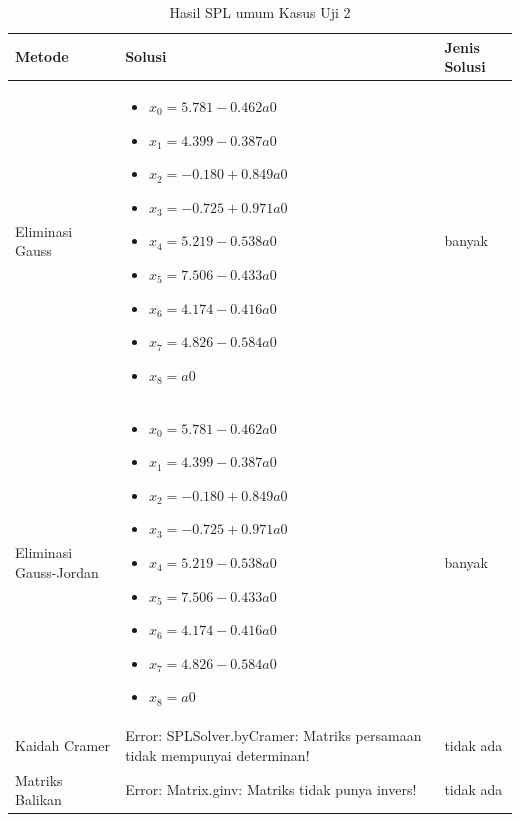 \documentclass[12pt,a4paper]{report}
\begin{document}
\begin{table}[H]
    \centering
    \caption{Hasil SPL umum Kasus Uji 2}
    \begin{tabular}{|l|p{5cm}|l|}
        \hline
        \textbf{Metode} & \textbf{Solusi} & \textbf{Jenis Solusi} \\
        \hline
        Eliminasi Gauss & 
        \begin{itemize}
            \item $x_0 = 5.781 - 0.462a0$
            \item $x_1 = 4.399 - 0.387a0$
            \item $x_2 = -0.180 + 0.849a0$
            \item $x_3 = -0.725 + 0.971a0$
            \item $x_4 = 5.219 - 0.538a0$
            \item $x_5 = 7.506 - 0.433a0$
            \item $x_6 = 4.174 - 0.416a0$
            \item $x_7 = 4.826 - 0.584a0$
            \item $x_8 = a0$
        \end{itemize}
        & banyak \\
        \hline
        Eliminasi Gauss-Jordan & 
        \begin{itemize}
            \item $x_0 = 5.781 - 0.462a0$
            \item $x_1 = 4.399 - 0.387a0$
            \item $x_2 = -0.180 + 0.849a0$
            \item $x_3 = -0.725 + 0.971a0$
            \item $x_4 = 5.219 - 0.538a0$
            \item $x_5 = 7.506 - 0.433a0$
            \item $x_6 = 4.174 - 0.416a0$
            \item $x_7 = 4.826 - 0.584a0$
            \item $x_8 = a0$
        \end{itemize}
        & banyak \\
        \hline
        Kaidah Cramer & 
        Error: SPLSolver.byCramer: Matriks persamaan tidak mempunyai determinan!
        & tidak ada \\
        \hline
        Matriks Balikan & 
        Error: Matrix.ginv: Matriks tidak punya invers!
        & tidak ada \\
        \hline
    \end{tabular}
\end{table}
 
\end{document}
